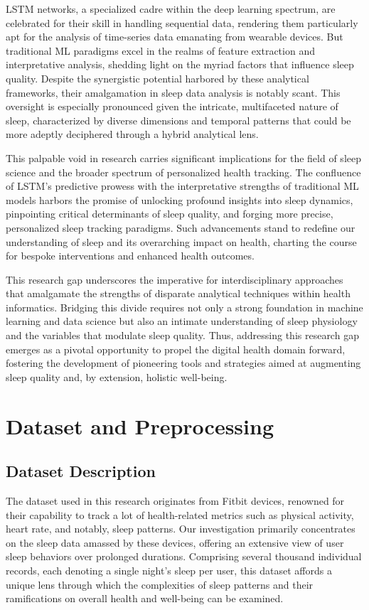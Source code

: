 \documentclass[10pt]{extarticle}
\begin{document}
LSTM networks, a specialized cadre within the deep learning spectrum, are celebrated for their skill in handling sequential data, rendering them particularly apt for the analysis of time-series data emanating from wearable devices. But traditional ML paradigms excel in the realms of feature extraction and interpretative analysis, shedding light on the myriad factors that influence sleep quality. Despite the synergistic potential harbored by these analytical frameworks, their amalgamation in sleep data analysis is notably scant. This oversight is especially pronounced given the intricate, multifaceted nature of sleep, characterized by diverse dimensions and temporal patterns that could be more adeptly deciphered through a hybrid analytical lens.

This palpable void in research carries significant implications for the field of sleep science and the broader spectrum of personalized health tracking. The confluence of LSTM's predictive prowess with the interpretative strengths of traditional ML models harbors the promise of unlocking profound insights into sleep dynamics, pinpointing critical determinants of sleep quality, and forging more precise, personalized sleep tracking paradigms. Such advancements stand to redefine our understanding of sleep and its overarching impact on health, charting the course for bespoke interventions and enhanced health outcomes.

This research gap underscores the imperative for interdisciplinary approaches that amalgamate the strengths of disparate analytical techniques within health informatics. Bridging this divide requires not only a strong foundation in machine learning and data science but also an intimate understanding of sleep physiology and the variables that modulate sleep quality. Thus, addressing this research gap emerges as a pivotal opportunity to propel the digital health domain forward, fostering the development of pioneering tools and strategies aimed at augmenting sleep quality and, by extension, holistic well-being.

\section{Dataset and Preprocessing}

\subsection{Dataset Description}

The dataset used in this research originates from Fitbit devices, renowned for their capability to track a lot of health-related metrics such as physical activity, heart rate, and notably, sleep patterns. Our investigation primarily concentrates on the sleep data amassed by these devices, offering an extensive view of user sleep behaviors over prolonged durations. Comprising several thousand individual records, each denoting a single night's sleep per user, this dataset affords a unique lens through which the complexities of sleep patterns and their ramifications on overall health and well-being can be examined.
\end{document}
